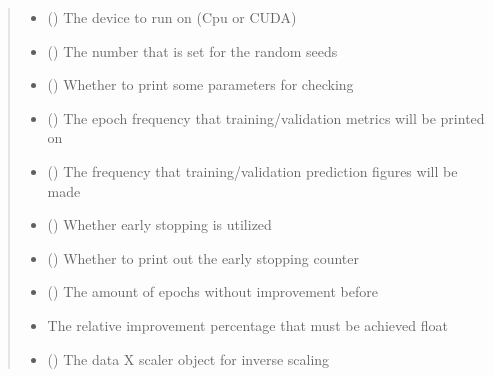 \documentclass[letterpaper,10pt,english]{sphinxmanual}
\begin{document}
\begin{fulllineitems}
\begin{quote}
\begin{description}
\begin{itemize}
\item {} 
 () \textendash{} The device to run on (Cpu or CUDA)

\item {} 
 () \textendash{} The number that is set for the random seeds

\item {} 
 () \textendash{} Whether to print some parameters for checking

\item {} 
 () \textendash{} The epoch frequency that training/validation
metrics will be printed on

\item {} 
 () \textendash{} The frequency that training/validation prediction
figures will be made

\item {} 
 () \textendash{} Whether early stopping is utilized

\item {} 
 () \textendash{} Whether to print out the early stopping counter

\item {} 
 () \textendash{} The amount of epochs without improvement before

\item {} 
 \textendash{} The relative improvement percentage that must be
achieved float

\item {} 
 () \textendash{} The data X scaler object for inverse scaling


\end{itemize}
\end{description}
\end{quote}
\end{fulllineitems}
\end{document}
